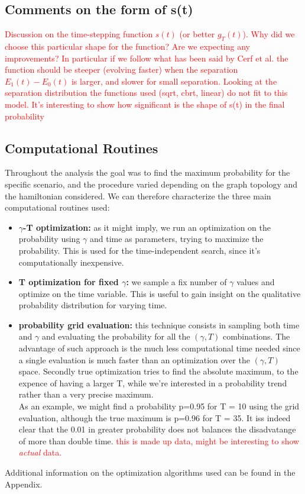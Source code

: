 \documentclass[aps,pra,reprint, onecolumn]{revtex4-2}
\newcommand{\red}[1]{\textcolor{red}{#1}}
\begin{document}
\subsection{Comments on the form of s(t)}
\red{Discussion on the time-stepping function $s(t)$ (or better  $g_T(t)$). Why did we choose this particular shape for the function? Are we expecting any improvements? In particular if we follow what has been said by Cerf et al. the function should be steeper (evolving faster) when the separation $E_1(t)-E_0(t)$ is larger, and slower for small separation. Looking at the separation distribution the functions used (sqrt, cbrt, linear) do not fit to this model. It's interesting to show how significant is the shape of s(t) in the final probability}


\subsection{Computational Routines}
Throughout the analysis the goal was to find the maximum probability for the specific scenario, and the procedure varied depending on the graph topology and the hamiltonian considered. We can therefore characterize the three main computational routines used:
\begin{itemize}
  \item \textbf{$\gamma$-T optimization:} as it might imply, we run an optimization on the probability using $\gamma$ and time as parameters, trying to maximize the probability. This is used for the time-independent search, since it's computationally inexpensive.
  \item \textbf{T optimization for fixed $\gamma$:} we sample a fix number of $\gamma$ values and optimize on the time variable. This is useful to gain insight on the qualitative probability distribution for varying time. 
  \item \textbf{probability grid evaluation:} this technique consists in sampling both time and $\gamma$ and evaluating the probability for all the $(\gamma, T)$ combinations. The advantage of such approach is the much less computational time needed since a single evaluation is much faster than an optimization over the $(\gamma, T)$ space. Secondly true optimization tries to find the absolute maximum, to the expence of having a larger T, while we're interested in a probability trend rather than a very precise maximum. \\ As an example, we might find a probability p=0.95 for T = 10 using the grid evaluation, although the true maximum is p=0.96 for T = 35. It iss indeed clear that the 0.01 in greater probability does not balances the disadvatange of more than double time. \red{this is made up data, might be interesting to show \textit{actual} data.}
\end{itemize}
Additional information on the optimization algorithms used can be found in the Appendix.
\end{document}
